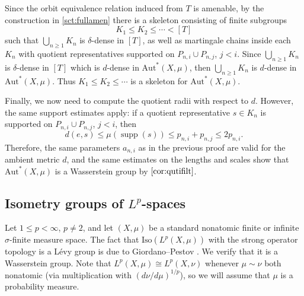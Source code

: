 \documentclass{amsart}
\numberwithin{equation}{subsection}
\theoremstyle{plain}
\theoremstyle{definition}
\theoremstyle{plain}
\begin{document}
\smallskip

Since the orbit equivalence relation induced from \(T\) is amenable, by the construction in \cref{sct:fullamen} there is a skeleton consisting of finite subgroups
\[K_{1}\leq K_{2}\leq\dotsm<\left[T\right]\]
such that \(\bigcup_{n\geq 1}K_{n}\) is \(\delta\)-dense in \(\left[T\right]\), as well as martingale chains inside each \(K_{n}\) with quotient representatives supported on \(P_{n,i}\cup P_{n,j}\), \(j<i\). Since \(\bigcup_{n\geq 1}K_{n}\) is \(\delta\)-dense in \(\left[T\right]\) which is \(d\)-dense in \(\mathrm{Aut}^{\ast}\left(X,\mu\right)\), then \(\bigcup_{n\geq1}K_{n}\) is \(d\)-dense in \(\mathrm{Aut}^{\ast}\left(X,\mu\right)\). Thus \(K_{1}\leq K_{2}\leq\dotsm\) is a skeleton for \(\mathrm{Aut}^{\ast}\left(X,\mu\right)\).

\smallskip

Finally, we now need to compute the quotient radii with respect to \(d\). However, the same support estimates apply: if a quotient representative \(s\in K_{n}\) is supported on \(P_{n,i}\cup P_{n,j}\), \(j<i\), then
\[d\left(e,s\right)\leq\mu\left(\operatorname{supp}\left(s\right)\right)\leq p_{n,i}+p_{n,j}\leq2p_{n,i}.\]
Therefore, the same parameters \(a_{n,i}\) as in the previous proof are valid for the ambient metric \(d\), and the same estimates on the lengths and scales show that \(\mathrm{Aut}^{\ast}\left(X,\mu\right)\) is a Wasserstein group by \(\cref{cor:qutifilt}\).

\subsection{Isometry groups of \(L^{p}\)-spaces}

Let \(1\leq p<\infty\), \(p\neq2\), and let \(\left(X,\mu\right)\) be a standard nonatomic finite or infinite \(\sigma\)-finite measure space. The fact that \(\mathrm{Iso}\left(L^{p}\left(X,\mu\right)\right)\) with the strong operator topology is a L\'{e}vy group is due to Giordano--Pestov \cite[Thm.~6.6]{giordano2007some}. We verify that it is a Wasserstein group. Note that \(L^{p}\left(X,\mu\right)\cong L^{p}\left(X,\nu\right)\) whenever \(\mu\sim\nu\) both nonatomic (via multiplication with \(\left(d\nu/d\mu\right)^{1/p}\)), so we will assume that \(\mu\) is a probability measure.

\smallskip
\end{document}
